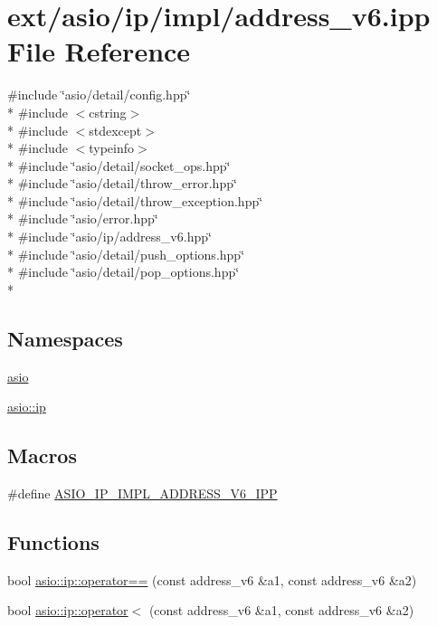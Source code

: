 \hypertarget{address__v6_8ipp}{}\section{ext/asio/ip/impl/address\+\_\+v6.ipp File Reference}
\label{address__v6_8ipp}
{\ttfamily \#include \char`\"{}asio/detail/config.\+hpp\char`\"{}}\\*
{\ttfamily \#include $<$cstring$>$}\\*
{\ttfamily \#include $<$stdexcept$>$}\\*
{\ttfamily \#include $<$typeinfo$>$}\\*
{\ttfamily \#include \char`\"{}asio/detail/socket\+\_\+ops.\+hpp\char`\"{}}\\*
{\ttfamily \#include \char`\"{}asio/detail/throw\+\_\+error.\+hpp\char`\"{}}\\*
{\ttfamily \#include \char`\"{}asio/detail/throw\+\_\+exception.\+hpp\char`\"{}}\\*
{\ttfamily \#include \char`\"{}asio/error.\+hpp\char`\"{}}\\*
{\ttfamily \#include \char`\"{}asio/ip/address\+\_\+v6.\+hpp\char`\"{}}\\*
{\ttfamily \#include \char`\"{}asio/detail/push\+\_\+options.\+hpp\char`\"{}}\\*
{\ttfamily \#include \char`\"{}asio/detail/pop\+\_\+options.\+hpp\char`\"{}}\\*
\subsection*{Namespaces}
\begin{DoxyCompactItemize}
\item 
 \hyperlink{namespaceasio}{asio}
\item 
 \hyperlink{namespaceasio_1_1ip}{asio\+::ip}
\end{DoxyCompactItemize}
\subsection*{Macros}
\begin{DoxyCompactItemize}
\item 
\#define \hyperlink{address__v6_8ipp_aef9cdc8304c9388f0cc7b5eea191330b}{A\+S\+I\+O\+\_\+\+I\+P\+\_\+\+I\+M\+P\+L\+\_\+\+A\+D\+D\+R\+E\+S\+S\+\_\+\+V6\+\_\+\+I\+P\+P}
\end{DoxyCompactItemize}
\subsection*{Functions}
\begin{DoxyCompactItemize}
\item 
bool \hyperlink{namespaceasio_1_1ip_aaee2f495d7b2c76c273e603d818bf62c}{asio\+::ip\+::operator==} (const address\+\_\+v6 \&a1, const address\+\_\+v6 \&a2)
\item 
bool \hyperlink{namespaceasio_1_1ip_a1c94815a0ef605c5e38938550157bd17}{asio\+::ip\+::operator$<$} (const address\+\_\+v6 \&a1, const address\+\_\+v6 \&a2)
\end{DoxyCompactItemize}


